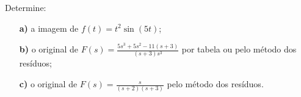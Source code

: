 \linespread{1.5}Determine: 
\begin{itemize}
    \item[\textbf{a)}] a imagem de $f(t) = t^2\sin{(5t)}$;
    \item[\textbf{b)}] o original de $F(s) = \frac{5s^3+5s^2-11(s+3)}{(s+3)s^3}$ por tabela ou pelo método dos resíduos;
    \item[\textbf{c)}] o original de $F(s) = \frac{s}{(s+2)(s+3)}$ pelo método dos resíduos.
\end{itemize}